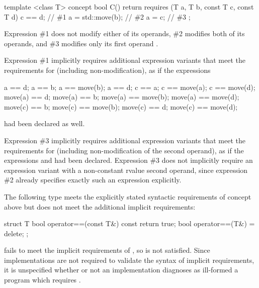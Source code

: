 \begin{addedblock}

\enterexample
\begin{codeblock}
template <class T>
concept bool C() {
  return requires (T a, T b, const T c, const T d) {
    c == d;       // \#1
    a = std::move(b);  // \#2
    a = c;        // \#3
  };
}
\end{codeblock}

Expression \#1 does not modify either of its operands, \#2 modifies both of its
operands, and \#3 modifies only its first operand .

Expression \#1 implicitly requires additional expression variants that meet the
requirements for  (including non-modification), as if the expressions
\begin{codeblock}
a == d;       a == b;             a == move(b);       a == d;
c == a;       c == move(a);       c == move(d);
move(a) == d; move(a) == b;       move(a) == move(b); move(a) == move(d);
move(c) == b; move(c) == move(b); move(c) == d;       move(c) == move(d);
\end{codeblock}
had been declared as well.

Expression \#3 implicitly requires additional expression variants that meet the
requirements for  (including non-modification of the second operand),
as if the expressions  and  had been declared.
Expression \#3 does not implicitly require an expression variant with a
non-constant rvalue second operand, since expression \#2 already specifies exactly
such an expression explicitly.
\exitexample

\enterexample
The following type  meets the explicitly stated syntactic requirements
of concept  above but does not meet the additional implicit requirements:

\begin{codeblock}
struct T {
  bool operator==(const T&) const { return true; }
  bool operator==(T&) = delete;
};
\end{codeblock}

 fails to meet the implicit
requirements of , so  is not satisfied. Since
implementations are not required to validate the syntax of implicit requirements, it
is unspecified whether or not an implementation diagnoses as ill-formed a program
which requires .
\exitexample


\end{addedblock}
